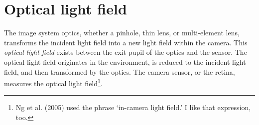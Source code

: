 \documentclass[
  letterpaper,
]{book}
\begin{document}
\begin{figure}



\end{figure}%

\section{Optical light field}\label{sec-optical-lightfield}

The image system optics, whether a pinhole, thin lens, or multi-element
lens, transforms the incident light field into a new light field within
the camera. This \emph{optical light field} exists between the exit
pupil of the optics and the sensor. The optical light field originates
in the environment, is reduced to the incident light field, and then
transformed by the optics. The camera sensor, or the retina, measures
the optical light field\footnote{Ng et al. (2005) used the phrase
  `in-camera light field.' I like that expression, too.}.
\end{document}
